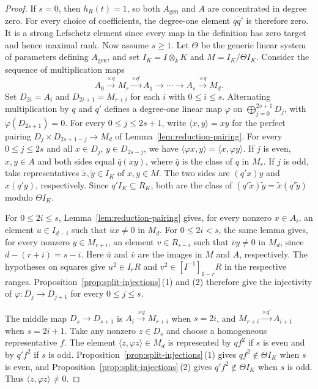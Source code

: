 \documentclass[a4paper,11pt]{amsart}
\newcommand{\kk}{k}
\theoremstyle{definition}
\begin{document}
\begin{proof}
If $s=0$, then $h_R(t)=1$, so both $A_{\mathrm{gen}}$ and $A$ are concentrated in degree zero. For every choice of coefficients, the degree-one element $\overline{qq'}$ is therefore zero. It is a strong Lefschetz element since every map in the definition has zero target and hence maximal rank. Now assume $s\ge1$. Let $\Theta$ be the generic linear system of parameters defining $A_{\mathrm{gen}}$, and set $I_K=I\otimes_{\kk}K$ and $M=I_K/\Theta I_K$. Consider the sequence of multiplication maps
\[
 A_0\xrightarrow{\times q}M_r\xrightarrow{\times q'}A_1\longrightarrow\cdots\longrightarrow A_s\xrightarrow{\times q}M_d.
\]
Set $D_{2i}=A_i$ and $D_{2i+1}=M_{r+i}$ for each $i$ with $0\le i\le s$. Alternating multiplication by $q$ and $q'$ defines a degree-one linear map $\varphi$ on $\bigoplus_{j=0}^{2s+1}D_j$, with $\varphi(D_{2s+1})=0$. For every $0\le j\le 2s+1$, write $\langle x,y\rangle=xy$ for the perfect pairing $D_j\times D_{2s+1-j}\to M_d$ of Lemma~\ref{lem:reduction-pairing}. For every $0\le j\le 2s$ and all $x\in D_j$, $y\in D_{2s-j}$, we have $\langle\varphi x,y\rangle=\langle x,\varphi y\rangle$. If $j$ is even, $x,y\in A$ and both sides equal $\bar q(xy)$, where $\bar q$ is the class of $q$ in $M_r$. If $j$ is odd, take representatives $\tilde x,\tilde y\in I_K$ of $x,y\in M$. The two sides are $(q'x)y$ and $x(q'y)$, respectively. Since $q'I_K\subseteq R_K$, both are the class of $(q'\tilde x)\tilde y=\tilde x(q'\tilde y)$ modulo $\Theta I_K$.

For $0\le 2i\le s$, Lemma~\ref{lem:reduction-pairing} gives, for every nonzero $x\in A_i$, an element $u\in I_{d-i}$ such that $\bar u x\ne0$ in $M_d$. For $0\le 2i<s$, the same lemma gives, for every nonzero $y\in M_{r+i}$, an element $v\in R_{s-i}$ such that $\bar v y\ne0$ in $M_d$, since $d-(r+i)=s-i$. Here $\bar u$ and $\bar v$ are the images in $M$ and $A$, respectively. The hypotheses on squares give $u^2\in I_rR$ and $v^2\in[I^{-1}]_{1-r}R$ in the respective ranges. Proposition~\ref{prop:split-injections}\,\textup{(1)} and \textup{(2)} therefore give the injectivity of $\varphi\colon D_j\to D_{j+1}$ for every $0\le j\le s$.

The middle map $D_s\to D_{s+1}$ is $A_i\xrightarrow{\times q}M_{r+i}$ when $s=2i$, and $M_{r+i}\xrightarrow{\times q'}A_{i+1}$ when $s=2i+1$. Take any nonzero $z\in D_s$ and choose a homogeneous representative $f$. The element $\langle z,\varphi z\rangle\in M_d$ is represented by $qf^2$ if $s$ is even and by $q'f^2$ if $s$ is odd. Proposition~\ref{prop:split-injections}\,\textup{(1)} gives $qf^2\notin\Theta I_K$ when $s$ is even, and Proposition~\ref{prop:split-injections}\,\textup{(2)} gives $q' f^2\notin\Theta I_K$ when $s$ is odd. Thus $\langle z,\varphi z\rangle\ne0$.


\end{proof}
\end{document}

